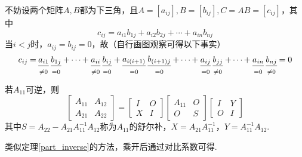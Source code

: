 \begin{analysis}
不妨设两个矩阵$A,B$都为下三角，且$A=[a_{ij}],B=[b_{ij}],C=AB=[c_{ij}]$，其中
\[c_{ij}=a_{i1}b_{1j}+a_{i2}b_{2j}+\cdots+a_{in}b_{nj}\]
当$i<j$时，$a_{ij}=b_{ij}=0$，故（自行画图观察可得以下事实）
\[\underwrite[0pt]{c_{ij}}{}\underwrite[0pt]{=}{}\underwrite{a_{i1}}{\ne 0}\underwrite{b_{1j}}{=0}\underwrite[0pt]{+\cdots+}{}\underwrite{a_{ii}}{\ne 0}\underwrite{b_{ij}}{=0}\underwrite[0pt]{+}{}\underwrite{a_{i(i+1)}}{=0}\underwrite{b_{(i+1)j}}{=0}\underwrite[0pt]{+\cdots+}{}\underwrite{a_{ij}}{=0}\underwrite{b_{jj}}{\ne 0}\underwrite[0pt]{+\cdots+}{}\underwrite{a_{in}}{=0}\underwrite{b_{nj}}{\ne 0}\underwrite[0pt]{= 0}{}\]
\end{analysis}
\begin{theorem}[舒尔(Schur)补]
若$A_{11}$可逆，则
\[\begin{bmatrix}A_{11}&A_{12}\\A_{21}&A_{22}\end{bmatrix}=\begin{bmatrix}I & O\\X & I\end{bmatrix}\begin{bmatrix}A_{11} & O\\O &S\end{bmatrix}\begin{bmatrix}I& Y\\O & I\end{bmatrix}\]
其中$S=A_{22}-A_{21}A_{11}^{-1}A_{12}$称为$A_{11}$的舒尔补，$X=A_{21}A_{11}^{-1}$，$Y=A_{11}^{-1}A_{12}$.
\end{theorem}
\begin{analysis}
类似定理\ref{part_inverse}的方法，乘开后通过对比系数可得.
\end{analysis}

